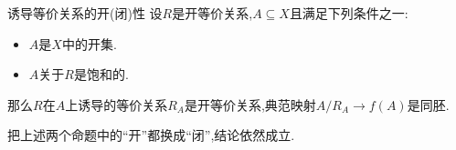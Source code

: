 \begin{proposition}{诱导等价关系的开(闭)性}{}
	设$R$是开等价关系,$A\subseteq X$且满足下列条件之一:
	\begin{itemize}
		\item $A$是$X$中的开集.
		\item $A$关于$R$是饱和的.
	\end{itemize}
	那么$R$在$A$上诱导的等价关系$R_{A}$是开等价关系,典范映射$A/R_{A}\to f\left(A\right)$是同胚.
\end{proposition}

\begin{remark}{}{}
	把上述两个命题中的``开''都换成``闭'',结论依然成立.
\end{remark}